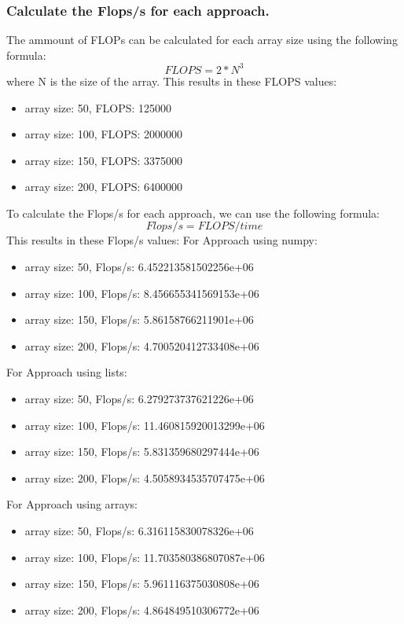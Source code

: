 \documentclass{article}
\begin{document}
\subsubsection{Calculate the Flops/s for each approach.}

The ammount of FLOPs can be calculated for each array size using the following formula:
\begin{equation}
    FLOPS = 2 * N^3
\end{equation}
where N is the size of the array.
This results in these FLOPS values:
\begin{itemize}
    \item array size:  50, FLOPS:  125000
    \item array size: 100, FLOPS:  2000000
    \item array size: 150, FLOPS:  3375000
    \item array size: 200, FLOPS:  6400000
\end{itemize}
To calculate the Flops/s for each approach, we can use the following formula:
\begin{equation}
    Flops/s = FLOPS / time
\end{equation}
This results in these Flops/s values:
For Approach using numpy:
\begin{itemize}
    \item array size:  50, Flops/s:  6.452213581502256e+06
    \item array size: 100, Flops/s:  8.456655341569153e+06
    \item array size: 150, Flops/s:  5.86158766211901e+06
    \item array size: 200, Flops/s:  4.700520412733408e+06
\end{itemize}
For Approach using lists:
\begin{itemize}
    \item array size:  50, Flops/s:  6.279273737621226e+06
    \item array size: 100, Flops/s:  11.460815920013299e+06
    \item array size: 150, Flops/s:  5.831359680297444e+06
    \item array size: 200, Flops/s:  4.5058934535707475e+06
\end{itemize}

For Approach using arrays:
\begin{itemize}
    \item array size:  50, Flops/s:  6.316115830078326e+06
    \item array size: 100, Flops/s:  11.703580386807087e+06
    \item array size: 150, Flops/s:  5.961116375030808e+06
    \item array size: 200, Flops/s:  4.864849510306772e+06
\end{itemize}
\end{document}
